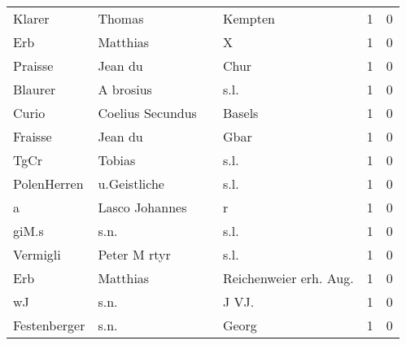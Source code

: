 \documentclass[10pt,a4paper,landscape]{article}
\begin{document}
\begin{longtable}{llllrr}
                   Klarer &                             Thomas &             &                                     Kempten &          1 &         0 \\
                      Erb &                           Matthias &             &                                           X &          1 &         0 \\
                  Praisse &                            Jean du &             &                                        Chur &          1 &         0 \\
                  Blaurer &                          A brosius &             &                                        s.l. &          1 &         0 \\
                    Curio &                   Coelius Secundus &             &                                      Basels &          1 &         0 \\
                  Fraisse &                            Jean du &             &                                        Gbar &          1 &         0 \\
                     TgCr &                             Tobias &             &                                        s.l. &          1 &         0 \\
              PolenHerren &                       u.Geistliche &             &                                        s.l. &          1 &         0 \\
                        a &                     Lasco Johannes &             &                                           r &          1 &         0 \\
                    giM.s &                               s.n. &             &                                        s.l. &          1 &         0 \\
                 Vermigli &                       Peter M rtyr &             &                                        s.l. &          1 &         0 \\
                      Erb &                           Matthias &             &                     Reichenweier erh. Aug.  &          1 &         0 \\
                       wJ &                               s.n. &             &                                      J VJ.  &          1 &         0 \\
             Festenberger &                               s.n. &             &                                       Georg &          1 &         0 \\

\end{longtable}
\end{document}
